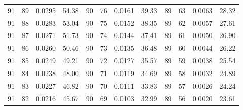 \begin{tabular}{llll|llll|llll}
91 & 89 & 0.0295 & 54.38 & 90 & 76 & 0.0161 & 39.33 & 89 & 63 & 0.0063 & 28.32\\
91 & 88 & 0.0283 & 53.04 & 90 & 75 & 0.0152 & 38.35 & 89 & 62 & 0.0057 & 27.61\\
91 & 87 & 0.0271 & 51.73 & 90 & 74 & 0.0144 & 37.41 & 89 & 61 & 0.0050 & 26.90\\
91 & 86 & 0.0260 & 50.46 & 90 & 73 & 0.0135 & 36.48 & 89 & 60 & 0.0044 & 26.22\\
91 & 85 & 0.0249 & 49.21 & 90 & 72 & 0.0127 & 35.57 & 89 & 59 & 0.0038 & 25.54\\
91 & 84 & 0.0238 & 48.00 & 90 & 71 & 0.0119 & 34.69 & 89 & 58 & 0.0032 & 24.89\\
91 & 83 & 0.0227 & 46.82 & 90 & 70 & 0.0111 & 33.83 & 89 & 57 & 0.0026 & 24.24\\
91 & 82 & 0.0216 & 45.67 & 90 & 69 & 0.0103 & 32.99 & 89 & 56 & 0.0020 & 23.61\\
\bottomrule
\end{tabular}
\newpage
